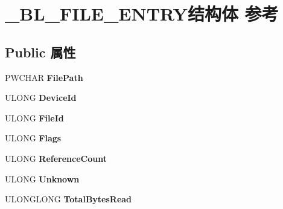 \hypertarget{struct___b_l___f_i_l_e___e_n_t_r_y}{}\section{\+\_\+\+B\+L\+\_\+\+F\+I\+L\+E\+\_\+\+E\+N\+T\+R\+Y结构体 参考}
\label{struct___b_l___f_i_l_e___e_n_t_r_y}
\subsection*{Public 属性}
\begin{DoxyCompactItemize}
\item 
\mbox{\label{struct___b_l___f_i_l_e___e_n_t_r_y_a7dceedc6ba5fe28fa71c51afa1ee5640}} 
P\+W\+C\+H\+AR {\bfseries File\+Path}
\item 
\mbox{\label{struct___b_l___f_i_l_e___e_n_t_r_y_a86c3016daa207c1567146c7764a3a824}} 
U\+L\+O\+NG {\bfseries Device\+Id}
\item 
\mbox{\label{struct___b_l___f_i_l_e___e_n_t_r_y_a6a68a2cec47caf72519e3a20c2c36014}} 
U\+L\+O\+NG {\bfseries File\+Id}
\item 
\mbox{\label{struct___b_l___f_i_l_e___e_n_t_r_y_aab24bee4e9ac93144886de4309b8d609}} 
U\+L\+O\+NG {\bfseries Flags}
\item 
\mbox{\label{struct___b_l___f_i_l_e___e_n_t_r_y_a7245b4177ab149d91ffbe1e22835219e}} 
U\+L\+O\+NG {\bfseries Reference\+Count}
\item 
\mbox{\label{struct___b_l___f_i_l_e___e_n_t_r_y_a743819e71b7d42b9addf2255eb909215}} 
U\+L\+O\+NG {\bfseries Unknown}
\item 
\mbox{\label{struct___b_l___f_i_l_e___e_n_t_r_y_a18a6660e3f1a1afdc6e897ff6cb39d8c}} 
U\+L\+O\+N\+G\+L\+O\+NG {\bfseries Total\+Bytes\+Read}
\item 
\mbox{\label{struct___b_l___f_i_l_e___e_n_t_r_y_af679b53fd8e8dee727e54b5e5fe91f95}} 

\end{DoxyCompactItemize}
